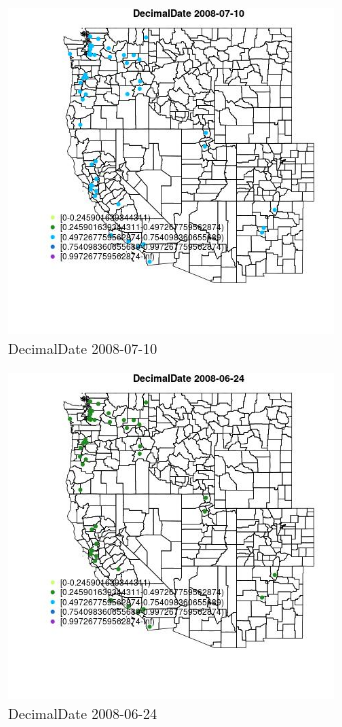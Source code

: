 \begin{figure} 
\centering  
\includegraphics[width=0.77\textwidth]{Code_Outputs/Report_ML_input_PM25_Step4_part_e_de_duplicated_aves_MapObsDecimalDate2008-07-10.jpg} 
\caption{\label{fig:Report_ML_input_PM25_Step4_part_e_de_duplicated_avesMapObsDecimalDate2008-07-10}DecimalDate 2008-07-10} 
\end{figure} 
 

\clearpage 

\begin{figure} 
\centering  
\includegraphics[width=0.77\textwidth]{Code_Outputs/Report_ML_input_PM25_Step4_part_e_de_duplicated_aves_MapObsDecimalDate2008-06-24.jpg} 
\caption{\label{fig:Report_ML_input_PM25_Step4_part_e_de_duplicated_avesMapObsDecimalDate2008-06-24}DecimalDate 2008-06-24} 
\end{figure} 
 

